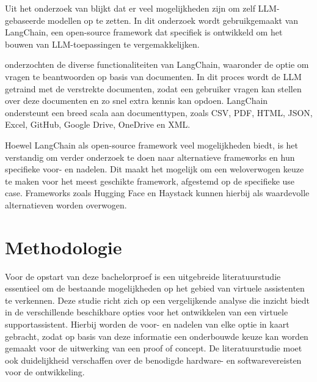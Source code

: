 Uit het onderzoek van \textcite{Topsakal2023} blijkt dat er veel mogelijkheden zijn om zelf LLM-gebaseerde modellen op te zetten. In dit onderzoek wordt gebruikgemaakt van LangChain, een open-source framework dat specifiek is ontwikkeld om het bouwen van LLM-toepassingen te vergemakkelijken.

\textcite{Topsakal2023} onderzochten de diverse functionaliteiten van LangChain, waaronder de optie om vragen te beantwoorden op basis van documenten. In dit proces wordt de LLM getraind met de verstrekte documenten, zodat een gebruiker vragen kan stellen over deze documenten en zo snel extra kennis kan opdoen. LangChain ondersteunt een breed scala aan documenttypen, zoals CSV, PDF, HTML, JSON, Excel, GitHub, Google Drive, OneDrive en XML.

Hoewel LangChain als open-source framework veel mogelijkheden biedt, is het verstandig om verder onderzoek te doen naar alternatieve frameworks en hun specifieke voor- en nadelen. Dit maakt het mogelijk om een weloverwogen keuze te maken voor het meest geschikte framework, afgestemd op de specifieke use case. Frameworks zoals Hugging Face en Haystack kunnen hierbij als waardevolle alternatieven worden overwogen.


\section{Methodologie}%
\label{sec:methodologie}

Voor de opstart van deze bachelorproef is een uitgebreide literatuurstudie essentieel om de bestaande mogelijkheden op het gebied van virtuele assistenten te verkennen. Deze studie richt zich op een vergelijkende analyse die inzicht biedt in de verschillende beschikbare opties voor het ontwikkelen van een virtuele supportassistent. Hierbij worden de voor- en nadelen van elke optie in kaart gebracht, zodat op basis van deze informatie een onderbouwde keuze kan worden gemaakt voor de uitwerking van een proof of concept. De literatuurstudie moet ook duidelijkheid verschaffen over de benodigde hardware- en softwarevereisten voor de ontwikkeling.

